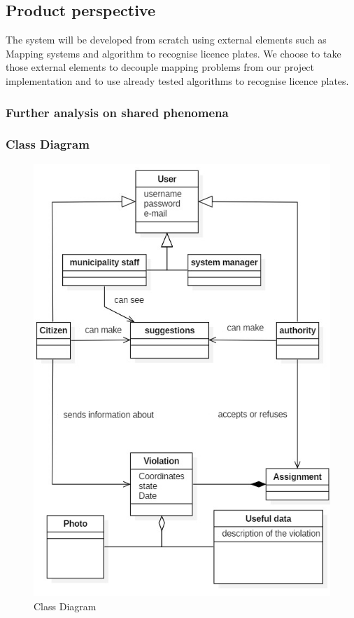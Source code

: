 \subsection{Product perspective}
The system will be developed from scratch using external elements such as Mapping systems and algorithm to recognise licence plates. We choose to take those external elements to decouple mapping problems from our project implementation and to use already tested algorithms to recognise licence plates.
\subsubsection{Further analysis on shared phenomena}

\subsubsection{Class Diagram}
\begin{figure}[h]
\centering
\includegraphics{Images/classdiagram.png}
\caption{\label{fig:cs} Class Diagram}
\end{figure}
\newpage
